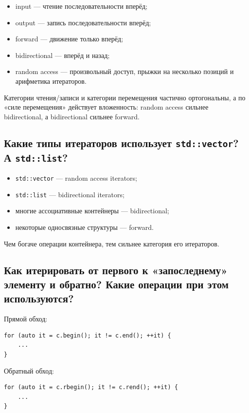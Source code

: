 \begin{itemize}
    \item input — чтение последовательности вперёд;
    \item output — запись последовательности вперёд;
    \item forward — движение только вперёд;
    \item bidirectional — вперёд и назад;
    \item random access — произвольный доступ, прыжки на несколько позиций и арифметика итераторов.
\end{itemize}

\begin{remark}
Категории чтения/записи и категории перемещения частично ортогональны, а по «силе перемещения» действует вложенность: random access сильнее bidirectional, а bidirectional сильнее forward.
\end{remark}

\subsection{Какие типы итераторов использует \texttt{std::vector}? А \texttt{std::list}?}
\begin{itemize}
    \item \texttt{std::vector} — random access iterators;
    \item \texttt{std::list} — bidirectional iterators;
    \item многие ассоциативные контейнеры — bidirectional;
    \item некоторые односвязные структуры — forward.
\end{itemize}

\begin{remark}
Чем богаче операции контейнера, тем сильнее категория его итераторов.
\end{remark}

\subsection{Как итерировать от первого к «запоследнему» элементу и обратно? Какие операции при этом используются?}
Прямой обход:
\begin{verbatim}
for (auto it = c.begin(); it != c.end(); ++it) {
    ...
}
\end{verbatim}

Обратный обход:
\begin{verbatim}
for (auto it = c.rbegin(); it != c.rend(); ++it) {
    ...
}
\end{verbatim}


